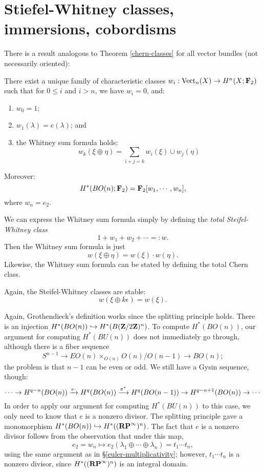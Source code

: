 \section{Stiefel-Whitney classes, immersions, cobordisms}
There is a result analogous to Theorem \ref{chern-classes} for all vector
bundles (not necessarily oriented):
\begin{theorem}
    There exist a unique family of characteristic classes $w_i:\operatorname{Vect}_n(X) \to
    H^n(X;\mathbf F_2)$ such that for $0\leq i$ and $i>n$, we have $w_i=0$, and:
    \begin{enumerate}
	\item $w_0 = 1$;
	\item $w_1(\lambda) = e(\lambda)$; and
	\item the Whitney sum formula holds:
	    \begin{equation*}
		w_k(\xi\oplus\eta) = \sum_{i+j=k} w_i(\xi)\cup w_j(\eta)
	    \end{equation*}
    \end{enumerate}
    Moreover:
    $$
    H^\ast(BO(n);\mathbf F_2) = \mathbf F_2[w_1,\cdots,w_n],
    $$
    where $w_n = e_2$.
\end{theorem}
\begin{remark}
    We can express the Whitney sum formula simply by defining the \emph{total
    Steifel-Whitney class}
    $$1 + w_1 + w_2 + \cdots=:w.$$
    Then the Whitney sum formula is just
    $$
    w(\xi\oplus\eta) = w(\xi)\cdot w(\eta).
    $$
    Likewise, the Whitney sum formula can be stated by defining the total Chern
    class.
\end{remark}
\begin{remark}\label{sw-stability}
    Again, the Steifel-Whitney classes are stable:
    $$w(\xi\oplus k\epsilon) = w(\xi).$$
\end{remark}
Again, Grothendieck's definition works since the splitting principle holds.
There is an injection $H^\ast(BO(n))\hookrightarrow H^\ast(B(\mathbf Z/2\mathbf Z)^n)$. To
compute $H^\ast(BO(n))$, our argument for computing $H^\ast(BU(n))$ does not
immediately go through, although there is a fiber sequence
$$S^{n-1} \to EO(n)\times_{O(n)} O(n)/O(n-1)\to BO(n);$$
the problem is that $n-1$ can be even or odd. We still have a Gysin sequence,
though:
$$
\cdots\to H^{q-n}(BO(n))\xrightarrow{{e\cdot}} H^q(BO(n)) \xrightarrow{{\pi^\ast}} H^q(BO(n-1)) \to H^{q-n+1}(BO(n))\to\cdots
$$
In order to apply our argument for computing $H^\ast(BU(n))$ to this case, we
only need to know that $e$ is a nonzero divisor. The splitting principle gave a
monomorphism $H^\ast(BO(n)) \hookrightarrow H^\ast((\mathbf{RP}^\infty)^n)$. The fact
that $e$ is a nonzero divisor follows from the observation that under this map,
$$e_2=w_n\mapsto e_2(\lambda_1\oplus\cdots\oplus\lambda_n) = t_1\cdots t_n,$$
using the same argument as in \S \ref{euler-multiplicativity}; however,
$t_1\cdots t_n$ {is} a nonzero divisor, since $H^\ast((\mathbf{RP}^\infty)^n)$ is an
integral domain.
